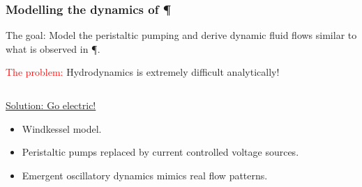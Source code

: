 \documentclass[	hyperref={pdfpagelabels=false}, xcolor=dvipsnames,
		11pt]{beamer}
\begin{document}
\begin{frame}
    \frametitle{Modelling the dynamics of \P} 

    \begin{block}{The goal:}
    	\vspace{-0.25cm}
    	Model the peristaltic pumping and derive dynamic fluid flows similar to what is observed in \P.
    \end{block}

	\textcolor{red}{The problem:} Hydrodynamics is extremely difficult analytically!

	\begin{columns}
	\begin{column}{4.5cm}

	\begin{overprint}

		\begin{alertblock}{\underline{Solution: Go electric!}}
		  \begin{itemize}
		   \item Windkessel model.
		   \item Peristaltic pumps replaced by current controlled voltage sources.
		   \item Emergent oscillatory dynamics mimics real flow patterns.
		  \end{itemize}
		\end{alertblock}
	\end{overprint}

	\end{column}

	\begin{column}{5cm}
	\begin{overprint}

\end{overprint}
\end{column}
\end{columns}
\end{frame}
\end{document}
